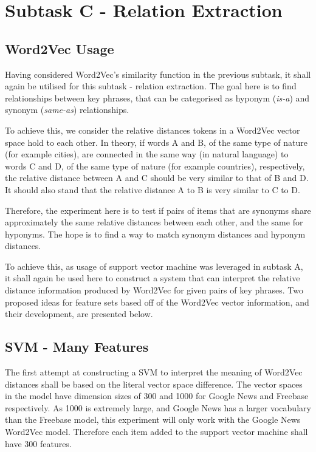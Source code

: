 \section{Subtask C - Relation Extraction}
\subsection{Word2Vec Usage}
Having considered Word2Vec's similarity function in the previous subtask, it shall again be utilised for this subtask - relation extraction. The goal here is to find relationships between key phrases, that can be categorised as hyponym (\textit{is-a}) and synonym (\textit{same-as}) relationships. 

To achieve this, we consider the relative distances tokens in a Word2Vec vector space hold to each other. In theory, if words A and B, of the same type of nature (for example cities), are connected in the same way (in natural language) to words C and D, of the same type of nature (for example countries), respectively, the relative distance between A and C should be very similar to that of B and D. It should also stand that the relative distance A to B is very similar to C to D. 

Therefore, the experiment here is to test if pairs of items that are synonyms share approximately the same relative distances between each other, and the same for hyponyms. The hope is to find a way to match synonym distances and hyponym distances. 

To achieve this, as usage of support vector machine was leveraged in subtask A, it shall again be used here to construct a system that can interpret the relative distance information produced by Word2Vec for given pairs of key phrases. Two proposed ideas for feature sets based off of the Word2Vec vector information, and their development, are presented below.

\subsection{SVM - Many Features}
The first attempt at constructing a SVM to interpret the meaning of Word2Vec distances shall be based on the literal vector space difference. The vector spaces in the model have dimension sizes of 300 and 1000 for Google News and Freebase respectively. As 1000 is extremely large, and Google News has a larger vocabulary than the Freebase model, this experiment will only work with the Google News Word2Vec model. Therefore each item added to the support vector machine shall have 300 features. 

